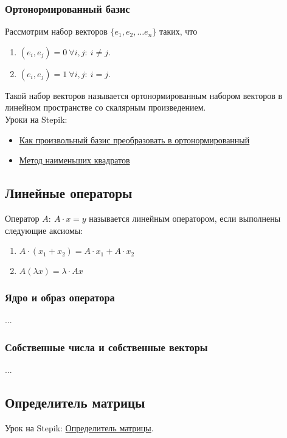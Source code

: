 \documentclass{article}
\begin{document}
\subsubsection{Ортонормированный базис}

Рассмотрим набор векторов $\{e_1, e_2, \dots e_n\}$ таких, что

\begin{enumerate}
	\item $(e_i, e_j) = 0 \ \forall i, j: \ i \ne j$.
	\item $(e_i, e_j) = 1 \ \forall i, j: \ i = j$.
\end{enumerate}

Такой набор векторов называется ортонормированным набором векторов в линейном пространстве со скалярным произведением. \\

Уроки на Stepik:

\begin{itemize}
	\item \href{https://stepik.org/lesson/9584/step/6?unit=23534}{Как произвольный базис преобразовать в ортонормированный}
	\item \href{https://stepik.org/lesson/9584/step/13?unit=23534}{Метод наименьших квадратов}
\end{itemize}

\subsection{Линейные операторы}

Оператор $A: \ A \cdot x = y$ называется линейным оператором, если выполнены следующие аксиомы:

\begin{enumerate}
	\item $A \cdot (x_1 + x_2) = A \cdot x_1 + A \cdot x_2$
	\item $A (\lambda x) = \lambda \cdot Ax$
\end{enumerate}

\subsubsection{Ядро и образ оператора}

...

\subsubsection{Собственные числа и собственные векторы}

...

\subsection{Определитель матрицы}

Урок на Stepik: \href{https://stepik.org/lesson/44077/step/1?unit=21901}{Определитель матрицы}.
\end{document}
